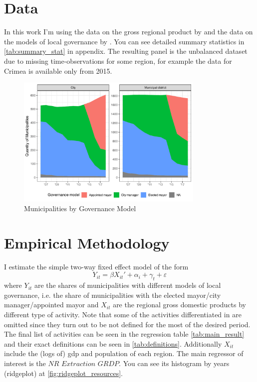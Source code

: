 \documentclass[12pt]{article}
\numberwithin{equation}{section}
\numberwithin{table}{section}
\numberwithin{figure}{section}
\begin{document}
\section{Data}

In this work I'm using the data on the gross regional product by \citet{ru_GDP_data} and the data on the models of local governance by \citet{model_data}. 
You can see detailed summary statistics in \vref{tab:summary_stat} in appendix. 
The resulting panel is the unbalanced dataset due to missing time-observations for some region, for example the data for Crimea is available only from 2015.



\begin{figure}[!htbp]\centering
  \caption{Municipalities by Governance Model}
  \label{fig:municipalities}
  \includegraphics[width=0.8\textwidth]{Figures/model_by_year_plot.pdf}
\end{figure}



\section{Empirical Methodology}

I estimate the simple two-way fixed effect model of the form
\begin{equation}
  Y_{it}=\beta X_{it}'+\alpha_i+\gamma_t+\varepsilon
\end{equation}
where $Y_{it}$ are the shares of municipalities with different models of local governance, i.e. the share of municipalities with the elected mayor/city manager/appointed mayor and $X_{it}$ are the regional gross domestic products by different type of activity. Note that some of the activities differentiated in \citet{ru_GDP_data} are omitted since they turn out to be not defined for the most of the desired period. The final list of activities can be seen in the regression table \vref{tab:main_result} and their exact definitions can be seen in \vref{tab:definitions}. 
Additionally $X_{it}$ include the (logs of) gdp and population of each region.
The main regressor of interest is the $\textit{NR Extraction GRDP}$. You can see its histogram by years (ridgeplot) at \vref{fig:ridgeplot_resources}.
\end{document}
